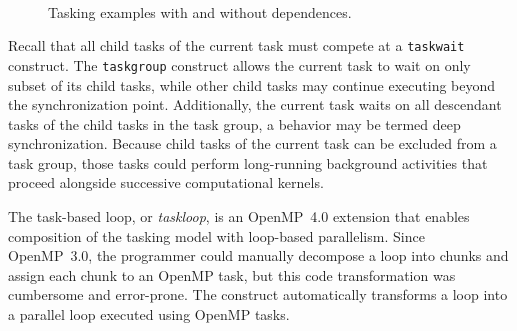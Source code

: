 \begin{figure}
~
~
\caption{Tasking examples with and without dependences.\label{fig:CodeTaskDeps}}
\end{figure}




Recall that all child tasks of the current task must compete at a \texttt{taskwait} construct.  The \texttt{taskgroup} construct allows the current task to wait on only subset of its child tasks, while other child tasks may continue executing beyond the synchronization point.  Additionally, the current task waits on all descendant tasks of the child tasks in the task group, a behavior may be termed deep synchronization.  Because child tasks of the current task can be excluded from a task group, those tasks could perform long-running background activities that proceed alongside successive computational kernels.






\label{sec:Taskloop}

The task-based loop, or \emph{taskloop}, is an OpenMP~4.0 extension that enables composition of the tasking model with loop-based parallelism.
Since OpenMP~3.0, the programmer could manually decompose a loop into chunks and assign each chunk to an OpenMP task, but this code transformation was cumbersome and error-prone.
The  construct automatically transforms a loop into a parallel loop executed using OpenMP tasks.

